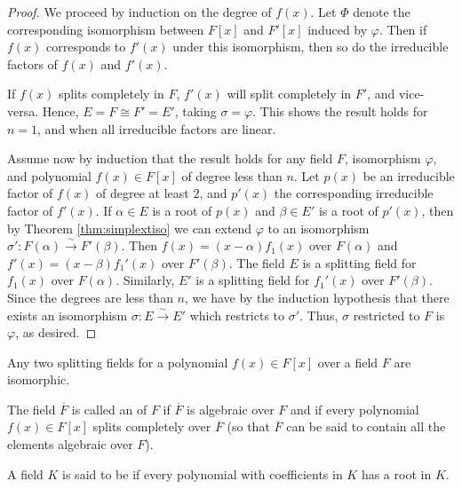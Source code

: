 \documentclass[12pt, a4paper, oneside, openright, titlepage]{book}
\begin{document}
\begin{proof}
    We proceed by induction on the degree of $f(x)$. Let $\Phi$ denote the corresponding isomorphism between $F[x]$ and $F'[x]$ induced by $\varphi$. Then if $f(x)$ corresponds to $f'(x)$ under this isomorphism, then so do the irreducible factors of $f(x)$ and $f'(x)$. 

    If $f(x)$ splits completely in $F$, $f'(x)$ will split completely in $F'$, and vice-versa. Hence, $E = F \cong F' = E'$, taking $\sigma = \varphi$. This shows the result holds for $n = 1$, and when all irreducible factors are linear.

    Assume now by induction that the result holds for any field $F$, isomorphism $\varphi$, and polynomial $f(x) \in F[x]$ of degree less than $n$. Let $p(x)$ be an irreducible factor of $f(x)$ of degree at least $2$, and $p'(x)$ the corresponding irreducible factor of $f'(x)$. If $\alpha \in E$ is a root of $p(x)$ and $\beta \in E'$ is a root of $p'(x)$, then by Theorem \ref{thm:simplextiso} we can extend $\varphi$ to an isomorphism $\sigma':F(\alpha)\xrightarrow{\sim}F'(\beta)$. Then $f(x) = (x-\alpha)f_1(x)$ over $F(\alpha)$ and $f'(x) = (x-\beta)f_1'(x)$ over $F'(\beta)$. The field $E$ is a splitting field for $f_1(x)$ over $F(\alpha)$. Similarly, $E'$ is a splitting field for $f_1'(x)$ over $F'(\beta)$. Since the degrees are less than $n$, we have by the induction hypothesis that there exists an isomorphism $\sigma:E\xrightarrow{\sim}E'$ which restricts to $\sigma'$. Thus, $\sigma$ restricted to $F$ is $\varphi$, as desired.
\end{proof}


\begin{cor}
    Any two splitting fields for a polynomial $f(x) \in F[x]$ over a field $F$ are isomorphic.
\end{cor}


\begin{defn}
    The field $\overline{F}$ is called an  of $F$ if $\overline{F}$ is algebraic over $F$ and if every polynomial $f(x) \in F[x]$ splits completely over $\overline{F}$ (so that $\overline{F}$ can be said to contain all the elements algebraic over $F$).
\end{defn}

\begin{defn}
    A field $K$ is said to be  if every polynomial with coefficients in $K$ has a root in $K$.
\end{defn}
\end{document}

